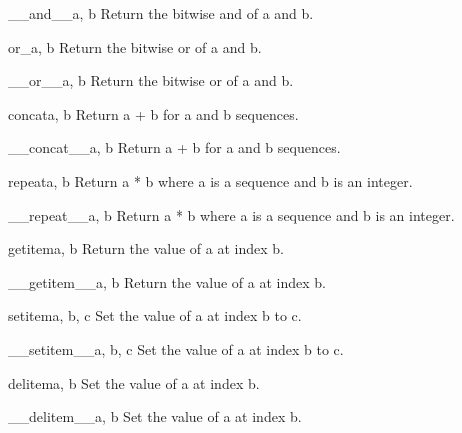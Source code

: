 \begin{funcdesc}{__and__}{a, b}
Return the bitwise and of a and b.
\end{funcdesc}

\begin{funcdesc}{or_}{a, b}
Return the bitwise or of a and b.
\end{funcdesc}

\begin{funcdesc}{__or__}{a, b}
Return the bitwise or of a and b.
\end{funcdesc}

\begin{funcdesc}{concat}{a, b}
Return a + b for a and b sequences.
\end{funcdesc}

\begin{funcdesc}{__concat__}{a, b}
Return a + b for a and b sequences.
\end{funcdesc}

\begin{funcdesc}{repeat}{a, b}
Return a * b where a is a sequence and b is an integer.
\end{funcdesc}

\begin{funcdesc}{__repeat__}{a, b}
Return a * b where a is a sequence and b is an integer.
\end{funcdesc}

\begin{funcdesc}{getitem}{a, b}
Return the value of a at index b.
\end{funcdesc}

\begin{funcdesc}{__getitem__}{a, b}
Return the value of a at index b.
\end{funcdesc}

\begin{funcdesc}{setitem}{a, b, c}
Set the value of a at index b to c.
\end{funcdesc}

\begin{funcdesc}{__setitem__}{a, b, c}
Set the value of a at index b to c.
\end{funcdesc}

\begin{funcdesc}{delitem}{a, b}
Set the value of a at index b.
\end{funcdesc}

\begin{funcdesc}{__delitem__}{a, b}
Set the value of a at index b.
\end{funcdesc}

